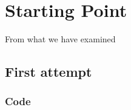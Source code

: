 
\section{Starting Point}

From what we have examined 

\subsection{First attempt}

\subsubsection{Code}



